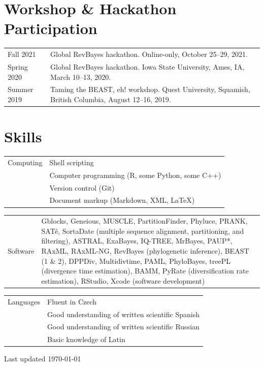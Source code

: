 \documentclass[10pt]{article}
\begin{document}
\section*{Workshop \& Hackathon Participation}

\begin{tabularx}{\textwidth}{>{\raggedleft\arraybackslash}p{2.2cm} X}
Fall 2021 & Global \textsf{RevBayes} hackathon. Online-only, October 25--29, 2021. \\[0.1cm]
Spring 2020 & Global \textsf{RevBayes} hackathon. Iowa State University, Ames, IA, March 10--13, 2020. \\[0.1cm]
Summer 2019 & Taming the BEAST, eh! workshop. Quest University, Squamish, British Columbia, August 12--16, 2019.
\end{tabularx}

\section*{Skills}

\begin{tabularx}{\textwidth}{>{\raggedleft\arraybackslash}p{2.2cm} X}
Computing & Shell scripting \\
& Computer programming (\textsf{R}, some \textsf{Python}, some \textsf{C++}) \\
& Version control (\textsf{Git}) \\
& Document markup (Markdown, XML, \LaTeX)
\end{tabularx}
\begin{tabularx}{\textwidth}{>{\raggedleft\arraybackslash}p{2.2cm} X}
Software & \textsf{Gblocks}, \textsf{Geneious}, \textsf{MUSCLE},  \textsf{PartitionFinder}, \textsf{Phyluce}, \textsf{PRANK}, \textsf{SAT\'{e}}, \textsf{SortaDate} (multiple sequence alignment, partitioning, and filtering), \textsf{ASTRAL}, \textsf{ExaBayes}, \textsf{IQ-TREE}, \textsf{MrBayes}, \textsf{PAUP*}, \textsf{RAxML}, \textsf{RAxML-NG}, \textsf{RevBayes} (phylogenetic inference), \textsf{BEAST (1 \& 2)}, \textsf{DPPDiv}, \textsf{Multidivtime}, \textsf{PAML}, \textsf{PhyloBayes}, \textsf{treePL} (divergence time estimation), \textsf{BAMM}, \textsf{PyRate} (diversification rate estimation), \textsf{RStudio}, \textsf{Xcode} (software development)
\end{tabularx}
\begin{tabularx}{\textwidth}{>{\raggedleft\arraybackslash}p{2.2cm} X}
Languages & Fluent in Czech \\
& Good understanding of written scientific Spanish \\
& Good understanding of written scientific Russian \\
& Basic knowledge of Latin
\end{tabularx}

\vspace*{1cm}

\noindent \begin{minipage}{16.51cm}
\begin{center}
Last updated \today
\end{center}
\end{minipage}
\end{document}
